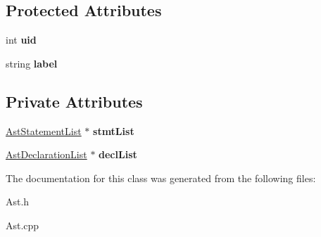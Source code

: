 \subsection*{Protected Attributes}
\begin{DoxyCompactItemize}
\item 
\hypertarget{classAST_a847b778f1c3dd5a19de32de432ee6e15}{int {\bfseries uid}}\label{classAST_a847b778f1c3dd5a19de32de432ee6e15}

\item 
\hypertarget{classAST_ab2e239ccc0688d2341724432ff5a1a31}{string {\bfseries label}}\label{classAST_ab2e239ccc0688d2341724432ff5a1a31}

\end{DoxyCompactItemize}
\subsection*{Private Attributes}
\begin{DoxyCompactItemize}
\item 
\hypertarget{classAstCompoundStmt_a85161f559cc57b430c024385c8a1f2a3}{\hyperlink{classAstStatementList}{Ast\-Statement\-List} $\ast$ {\bfseries stmt\-List}}\label{classAstCompoundStmt_a85161f559cc57b430c024385c8a1f2a3}

\item 
\hypertarget{classAstCompoundStmt_a62b2b1293235fca6720fe97cd9174da5}{\hyperlink{classAstDeclarationList}{Ast\-Declaration\-List} $\ast$ {\bfseries decl\-List}}\label{classAstCompoundStmt_a62b2b1293235fca6720fe97cd9174da5}

\end{DoxyCompactItemize}


The documentation for this class was generated from the following files\-:\begin{DoxyCompactItemize}
\item 
Ast.\-h\item 
Ast.\-cpp\end{DoxyCompactItemize}

